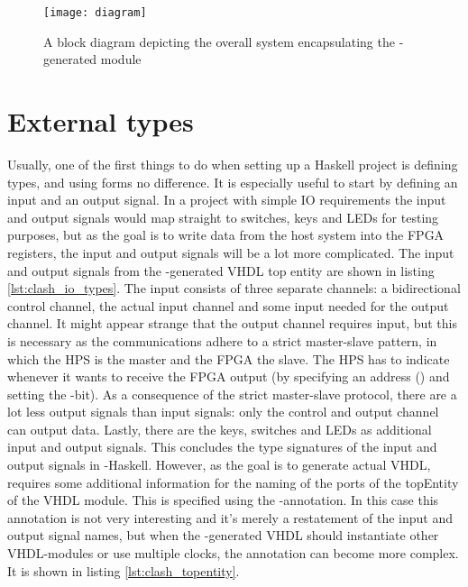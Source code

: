 \begin{sidewaysfigure}
	\centering
	\texttt{[image: diagram]}	
	\caption{A block diagram depicting the overall system encapsulating the \clash{}-generated module}
	\label{f:large_structure}
\end{sidewaysfigure}

\section{External types}
Usually, one of the first things to do when setting up a Haskell project is defining types, and using \clash{} forms no difference. It is especially useful to start by defining an input and an output signal. In a project with simple IO requirements the input and output signals would map straight to switches, keys and LEDs for testing purposes, but as the goal is to write data from the host system into the FPGA registers, the input and output signals will be a lot more complicated. The input and output signals from the \clash{}-generated VHDL top entity are shown in listing \ref{lst:clash_io_types}. The input consists of three separate channels: a bidirectional control channel, the actual input channel and some input needed for the output channel. It might appear strange that the output channel requires input, but this is necessary as the communications adhere to a strict master-slave pattern, in which the HPS is the master and the FPGA the slave. The HPS has to indicate whenever it wants to receive the FPGA output (by specifying an address () and setting the -bit). As a consequence of the strict master-slave protocol, there are a lot less output signals than input signals: only the control and output channel can output data. Lastly, there are the keys, switches and LEDs as additional input and output signals. This concludes the type signatures of the input and output signals in \clash{}-Haskell. However, as the goal is to generate actual VHDL, \clash{} requires some additional information for the naming of the ports of the topEntity of the VHDL module. This is specified using the -annotation. In this case this annotation is not very interesting and it's merely a restatement of the input and output signal names, but when the \clash{}-generated VHDL should instantiate other VHDL-modules or use multiple clocks, the annotation can become more complex. It is shown in listing \ref{lst:clash_topentity}. 




